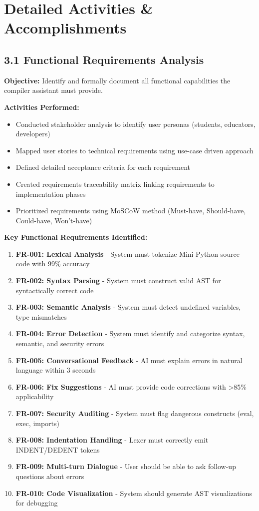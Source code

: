 \documentclass[a4paper,11pt]{article}
\begin{document}
\section{Detailed Activities \& Accomplishments}

\subsection{3.1 Functional Requirements Analysis}

\textbf{Objective:} Identify and formally document all functional capabilities the compiler assistant must provide.

\textbf{Activities Performed:}
\begin{itemize}[leftmargin=*]
    \item Conducted stakeholder analysis to identify user personas (students, educators, developers)
    \item Mapped user stories to technical requirements using use-case driven approach
    \item Defined detailed acceptance criteria for each requirement
    \item Created requirements traceability matrix linking requirements to implementation phases
    \item Prioritized requirements using MoSCoW method (Must-have, Should-have, Could-have, Won't-have)
\end{itemize}

\textbf{Key Functional Requirements Identified:}

\begin{enumerate}[leftmargin=*]
    \item \textbf{FR-001: Lexical Analysis} - System must tokenize Mini-Python source code with 99\% accuracy
    \item \textbf{FR-002: Syntax Parsing} - System must construct valid AST for syntactically correct code
    \item \textbf{FR-003: Semantic Analysis} - System must detect undefined variables, type mismatches
    \item \textbf{FR-004: Error Detection} - System must identify and categorize syntax, semantic, and security errors
    \item \textbf{FR-005: Conversational Feedback} - AI must explain errors in natural language within 3 seconds
    \item \textbf{FR-006: Fix Suggestions} - AI must provide code corrections with >85\% applicability
    \item \textbf{FR-007: Security Auditing} - System must flag dangerous constructs (eval, exec, imports)
    \item \textbf{FR-008: Indentation Handling} - Lexer must correctly emit INDENT/DEDENT tokens
    \item \textbf{FR-009: Multi-turn Dialogue} - User should be able to ask follow-up questions about errors
    \item \textbf{FR-010: Code Visualization} - System should generate AST visualizations for debugging
\end{enumerate}
\end{document}
